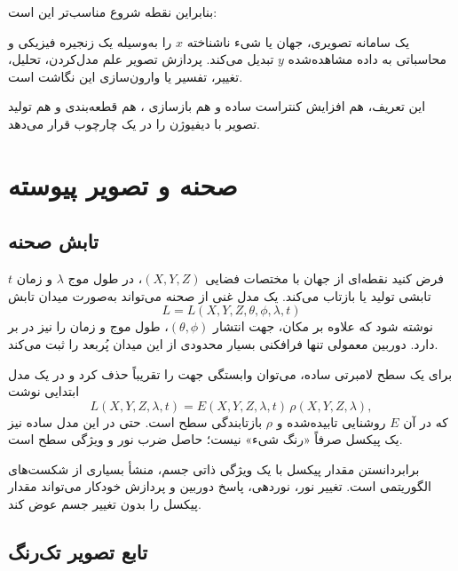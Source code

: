 \documentclass[12pt,openany,oneside]{book}
\begin{document}
بنابراین نقطه شروع مناسب‌تر این است:

\begin{keybox}
یک سامانه تصویری، جهان یا شیء ناشناخته \(x\) را به‌وسیله یک زنجیره فیزیکی و محاسباتی
به داده مشاهده‌شده \(y\) تبدیل می‌کند. پردازش تصویر علم مدل‌کردن، تحلیل، تغییر، تفسیر
یا وارون‌سازی این نگاشت است.
\end{keybox}

این تعریف، هم افزایش کنتراست ساده و هم بازسازی ، هم قطعه‌بندی و هم تولید تصویر
با دیفیوژن را در یک چارچوب قرار می‌دهد.

\section{صحنه و تصویر پیوسته}

\subsection{تابش صحنه}

فرض کنید نقطه‌ای از جهان با مختصات فضایی \((X,Y,Z)\)، در طول موج \(\lambda\) و زمان \(t\)
تابشی تولید یا بازتاب می‌کند. یک مدل غنی از صحنه می‌تواند به‌صورت میدان تابش
\begin{equation}
L=L(X,Y,Z,\theta,\phi,\lambda,t)
\end{equation}
نوشته شود که علاوه بر مکان، جهت انتشار \((\theta,\phi)\)، طول موج و زمان را نیز در بر دارد.
دوربین معمولی تنها فرافکنی بسیار محدودی از این میدان پُربعد را ثبت می‌کند.

برای یک سطح لامبرتی ساده، می‌توان وابستگی جهت را تقریباً حذف کرد و در یک مدل ابتدایی نوشت
\begin{equation}
L(X,Y,Z,\lambda,t)=E(X,Y,Z,\lambda,t)\,\rho(X,Y,Z,\lambda),
\end{equation}
که در آن \(E\) روشنایی تابیده‌شده و \(\rho\) بازتابندگی سطح است. حتی در این مدل ساده نیز
یک پیکسل صرفاً «رنگ شیء» نیست؛ حاصل ضرب نور و ویژگی سطح است.

\begin{warningbox}
برابردانستن مقدار پیکسل با یک ویژگی ذاتی جسم، منشأ بسیاری از شکست‌های الگوریتمی است.
تغییر نور، نوردهی، پاسخ دوربین و پردازش خودکار می‌تواند مقدار پیکسل را بدون تغییر جسم عوض کند.
\end{warningbox}

\subsection{تابع تصویر تک‌رنگ}
\end{document}
